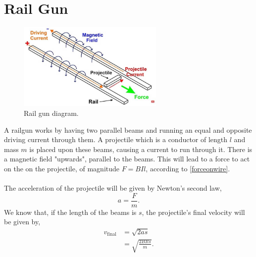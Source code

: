 \documentclass{book}
\begin{document}
\section{Rail Gun}
\begin{figure}[ht]
    \centering
    \includegraphics[width=200pt]{RailGunDiagram.jpg}
    \caption{Rail gun diagram.}
    \label{fig:railgun}
\end{figure}
\noindent
A railgun works by having two parallel beams and running an equal and opposite driving current through them. A projectile which is a conductor of length $l$ and mass $m$ is placed upon these beams, causing a current to run through it. There is a magnetic field "upwards", parallel to the beams. This will lead to a force to act on the on the projectile, of magnitude $F = BIl$, according to \eqref{forceonwire}. \\\\
The acceleration of the projectile will be given by Newton's second law, 
\begin{equation*}
    a = \frac{F}{m}.
\end{equation*}
We know that, if the length of the beams is $s$, the projectile's final velocity will be given by,
\begin{equation}
    \begin{split}
        v_{\text{final}} &= \sqrt{2as} \\
        & = \sqrt{\frac{2BIls}{m}}.
    \end{split}
\end{equation}
\end{document}
